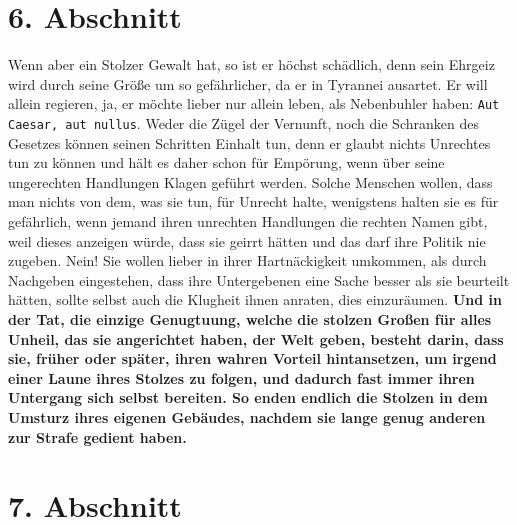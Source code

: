 \section{6. Abschnitt} \label{kap12_ab6}

Wenn aber ein Stolzer Gewalt hat, so ist er höchst
schädlich, denn sein Ehrgeiz
wird durch seine Größe um so gefährlicher, da er in Tyrannei
ausartet. Er will
allein regieren, ja, er möchte lieber nur allein leben, als Nebenbuhler haben:
\texttt{Aut Caesar, aut nullus}. Weder die Zügel der Vernunft, noch die
Schranken des
Gesetzes können seinen Schritten Einhalt tun, denn er glaubt nichts Unrechtes
tun zu können und hält es daher schon für Empörung, wenn über seine ungerechten
Handlungen Klagen geführt werden. Solche Menschen wollen, dass man nichts von
dem, was sie tun, für Unrecht halte, wenigstens halten sie es für gefährlich,
wenn jemand ihren unrechten Handlungen die rechten Namen gibt, weil dieses
anzeigen würde, dass sie geirrt hätten und das darf ihre Politik nie zugeben.
Nein! Sie wollen lieber in ihrer Hartnäckigkeit umkommen, als durch Nachgeben
eingestehen, dass ihre Untergebenen eine Sache besser als sie beurteilt hätten,
sollte selbst auch die Klugheit ihnen anraten, dies einzuräumen. \textbf{Und in
der
Tat, die einzige Genugtuung, welche die stolzen Großen für alles Unheil, das
sie angerichtet haben, der Welt geben, besteht darin, dass sie, früher oder
später, ihren wahren Vorteil hintansetzen, um irgend einer Laune ihres Stolzes
zu folgen, und dadurch fast immer ihren Untergang sich selbst bereiten. So enden
endlich die Stolzen in dem Umsturz ihres eigenen Gebäudes, nachdem sie lange
genug anderen zur Strafe gedient haben.}

\section{7. Abschnitt} \label{kap12_ab7}

